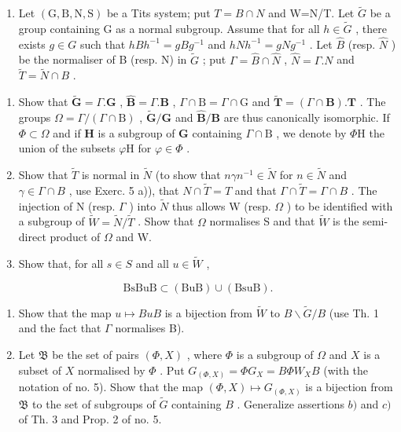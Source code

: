 \begin{enumerate}
\def\labelenumi{\arabic{enumi})}
\setcounter{enumi}{7}
\tightlist
\item
  Let \((\mathrm{G},\mathrm{B},\mathrm{N},\mathrm{S})\) be a Tits system; put \(T=B\cap N\) and W=N/T. Let \(\tilde{G}\) be a group containing G as a normal subgroup. Assume that for all \(h\in\tilde{G}\) , there exists \(g\in G\) such that \(hBh^{-1}=gBg^{-1}\) and \(hNh^{-1}=gNg^{-1}\) . Let \(\hat{B}\) (resp. \(\hat{N}\) ) be the normaliser of B (resp. N) in \(\tilde{G}\) ; put \(\Gamma=\hat{B}\cap\hat{N}\) , \(\hat{N}=\Gamma.N\) and \(\tilde{T}=\tilde{N}\cap B\) .
\end{enumerate}

\begin{enumerate}
\def\labelenumi{\alph{enumi})}
\item
  Show that \(\tilde{\mathbf{G}} = \Gamma .\mathbf{G}\) , \(\hat{\mathbf{B}} = \Gamma .\mathbf{B}\) , \(\Gamma \cap \mathrm{B} = \Gamma \cap \mathrm{G}\) and \(\tilde{\mathbf{T}} = (\Gamma \cap \mathbf{B}).\mathbf{T}\) . The groups \(\Omega = \Gamma /(\Gamma \cap \mathrm{B})\) , \(\tilde{\mathbf{G}} /\mathbf{G}\) and \(\hat{\mathbf{B}} /\mathbf{B}\) are thus canonically isomorphic. If \(\varPhi \subset \varOmega\) and if \(\mathbf{H}\) is a subgroup of \(\mathbf{G}\) containing \(\Gamma \cap \mathrm{B}\) , we denote by \(\varPhi \mathrm{H}\) the union of the subsets \(\varphi \mathrm{H}\) for \(\varphi \in \varPhi\) .
\item
  Show that \(\tilde{T}\) is normal in \(\tilde{N}\) (to show that \(n\gamma n^{-1} \in \tilde{N}\) for \(n \in \tilde{N}\) and \(\gamma \in \Gamma \cap B\) , use Exerc. 5 a)), that \(N \cap \tilde{T} = T\) and that \(\Gamma \cap \tilde{T} = \Gamma \cap B\) . The injection of N (resp. \(\Gamma\) ) into \(\tilde{N}\) thus allows W (resp. \(\Omega\) ) to be identified with a subgroup of \(\tilde{W} = \tilde{N}/\tilde{T}\) . Show that \(\Omega\) normalises S and that \(\tilde{W}\) is the semi-direct product of \(\Omega\) and W.
\item
  Show that, for all \(s \in S\) and all \(u \in \tilde{W}\) ,
\end{enumerate}

\[
\mathrm{BsBuB} \subset (\mathrm{BuB}) \cup (\mathrm{BsuB}).
\]

\begin{enumerate}
\def\labelenumi{\alph{enumi})}
\setcounter{enumi}{3}
\item
  Show that the map \(u \mapsto BuB\) is a bijection from \(\tilde{W}\) to \(B\backslash\tilde{G}/B\) (use Th. 1 and the fact that \(\Gamma\) normalises B).
\item
  Let \(\mathfrak{B}\) be the set of pairs \((\varPhi, X)\) , where \(\varPhi\) is a subgroup of \(\Omega\) and \(X\) is a subset of \(X\) normalised by \(\varPhi\) . Put \(G_{(\varPhi, X)} = \varPhi G_X = B \varPhi W_X B\) (with the notation of no. 5). Show that the map \((\varPhi, X) \mapsto G_{(\varPhi, X)}\) is a bijection from \(\mathfrak{B}\) to the set of subgroups of \(\tilde{G}\) containing \(B\) . Generalize assertions \(b)\) and \(c)\) of Th. 3 and Prop. 2 of no. 5.
\end{enumerate}

